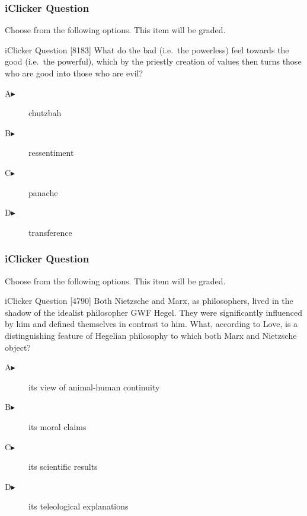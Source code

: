 \documentclass[xcolor=dvipsnames]{beamer}
\begin{document}
\begin{frame}
  \frametitle{iClicker Question}
Choose from the following options. This item will be graded.
\begin{block}{iClicker Question}
[8183] What do the bad (i.e.\ the powerless) feel towards the good (i.e.\ the powerful), which by the priestly creation of values then turns those who are good into those who are evil?
\end{block}
\begin{description}
\item[A\hspace{.2in}$\blacktriangleright$] chutzbah
\item[B\hspace{.2in}$\blacktriangleright$] ressentiment
\item[C\hspace{.2in}$\blacktriangleright$] panache
\item[D\hspace{.2in}$\blacktriangleright$] transference
\end{description}
\end{frame}\begin{frame}
  \frametitle{iClicker Question}
Choose from the following options. This item will be graded.
\begin{block}{iClicker Question}
  [4790] Both Nietzsche and Marx, as philosophers, lived in the shadow of the idealist philosopher GWF Hegel. They were significantly influenced by him and defined themselves in contrast to him. What, according to Love, is a distinguishing feature of Hegelian philosophy to which both Marx and Nietzsche object?
\end{block}
\begin{description}
\item[A\hspace{.2in}$\blacktriangleright$] its view of animal-human continuity
\item[B\hspace{.2in}$\blacktriangleright$] its moral claims
\item[C\hspace{.2in}$\blacktriangleright$] its scientific results
\item[D\hspace{.2in}$\blacktriangleright$] its teleological explanations
\end{description}
\end{frame}
\end{document}
